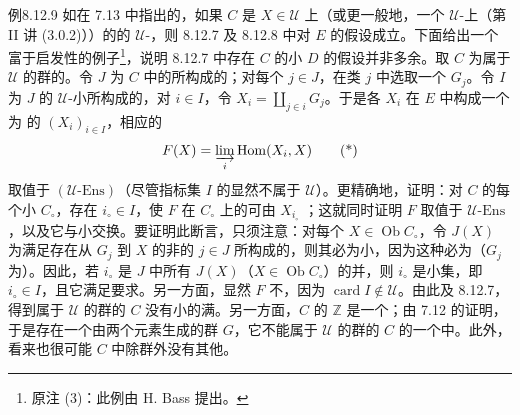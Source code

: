 \begin{SGAresult}{例}{8.12.9}
如在 7.13 中指出的，如果 $C$ 是 $X\in\mathcal U$ 上（或更一般地，一个 $\mathcal U$-上（第 II 讲 (3.0.2)））的的 $\mathcal U$-，则 8.12.7 及 8.12.8 中对 $E$ 的假设成立。下面给出一个富于启发性的例子\footnote{原注 (3)：此例由 H. Bass 提出。}，说明 8.12.7 中存在 $C$ 的小 $D$ 的假设并非多余。取 $C$ 为属于 $\mathcal U$ 的群的。令 $J$ 为 $C$ 中的所构成的；对每个 $j\in J$，在类 $j$ 中选取一个 $G_j$。令 $I$ 为 $J$ 的 $\mathcal U$-小所构成的，对 $i\in I$，令 $X_i=\coprod_{j\in i}G_j$。于是各 $X_i$ 在 $E$ 中构成一个为
的 $(X_i)_{i\in I}$，相应的
\[
F(X)=\varinjlim_i\operatorname{Hom}(X_i,X)\tag{*}
\]
取值于 $(\mathcal U\text{-}\mathrm{Ens})$（尽管指标集 $I$ 的显然不属于 $\mathcal U$）。更精确地，证明：对 $C$ 的每个小 $C_\circ$，存在 $i_\circ\in I$，使 $F$ 在 $C_\circ$ 上的可由 $X_{i_\circ}$ ；这就同时证明 $F$ 取值于 $\mathcal U\text{-}\mathrm{Ens}$，以及它与小交换。要证明此断言，只须注意：对每个 $X\in\operatorname{Ob}C_\circ$，令 $J(X)$ 为满足存在从 $G_j$ 到 $X$ 的非的 $j\in J$ 所构成的，则其必为小，因为这种必为（$G_j$ 为）。因此，若 $i_\circ$ 是 $J$ 中所有 $J(X)$（$X\in\operatorname{Ob}C_\circ$）的并，则 $i_\circ$ 是小集，即 $i_\circ\in I$，且它满足要求。另一方面，显然 $F$ 不，因为 $\operatorname{card}I\notin\mathcal U$。由此及 8.12.7，得到属于 $\mathcal U$ 的群的 $C$ 没有小的满。另一方面，$C$ 的 $\mathbb Z$ 是一个；由 7.12 的证明，于是存在一个由两个元素生成的群 $G$，它不能属于 $\mathcal U$ 的群的 $C$ 的一个中。此外，看来也很可能 $C$ 中除群外没有其他。
\end{SGAresult}

